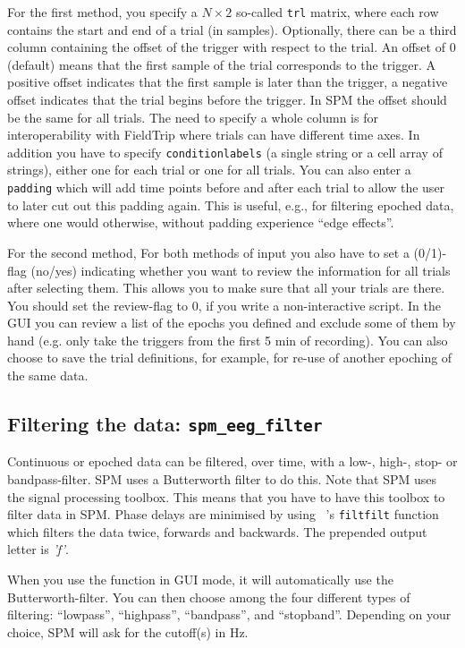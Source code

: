 For the first method, you specify a $N \times 2$ so-called \texttt{trl} matrix, where each row contains the start and end of a trial (in samples). Optionally, there can be a third column containing the offset of the trigger with respect to the trial. An offset of 0 (default) means that the first sample of the trial corresponds to the trigger. A positive offset indicates that the first sample is later than the trigger, a negative offset indicates that the trial begins before the trigger. In SPM the offset should be the same for all trials. The need to specify a whole column is for interoperability with FieldTrip where trials can have different time axes. In addition you have to specify \texttt{conditionlabels} (a single string or a cell array of strings), either one for each trial or one for all trials. You can also enter a \texttt{padding} which will add time points before and after each trial to allow the user to later cut out this padding again. This is useful, e.g., for filtering epoched data, where one would otherwise, without padding experience ``edge effects''.

For the second method, 
For both methods of input you also have to set a (0/1)-flag (no/yes) indicating whether you want to review the information for all trials after selecting them. This allows you to make sure that all your trials are there. You should set the review-flag to 0, if you write a non-interactive script. In the GUI you can review a list of the epochs you defined and exclude some of them by hand (e.g. only take the triggers from the first 5 min of recording). You can also choose to save the trial definitions, for example, for re-use of another epoching of the same data.

\subsection{Filtering the data: \texttt{spm\_eeg\_filter}} 
Continuous or epoched data can be filtered, over time, with a low-, high-, stop- or bandpass-filter. SPM uses a Butterworth filter to do this. Note that SPM uses the signal processing toolbox. This means that you have to have this toolbox to filter data in SPM. Phase delays are minimised by using \matlab\ 's \texttt{filtfilt} function which filters the data twice, forwards and backwards. The prepended output letter is \textit{'f'}.

When you use the function in GUI mode, it will automatically
use the Butterworth-filter. You can then choose among the four different types of filtering: ``lowpass'', ``highpass'', ``bandpass'',
and ``stopband''. Depending on your choice, SPM will ask for the cutoff(s) in Hz.

